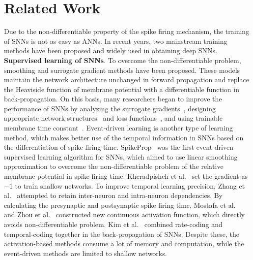 \documentclass[letterpaper]{article} %
\begin{document}
\section{Related Work}
Due to the non-differentiable property of the spike firing mechanism, the training of SNNs is not as easy as ANNs. %
In recent years, two mainstream training methods have been proposed and widely used in obtaining deep SNNs.\\
\textbf{Supervised learning of SNNs}. To overcome the non-differentiable problem, smoothing and surrogate gradient methods \cite{huh2017gradient,jin2018hybrid,wu2018STBP,shrestha2018slayer,zenke2018superspike,bellec2018long,neftci2019surrogate} have been proposed. These models maintain the network architecture unchanged in forward propagation and replace the Heaviside function of membrane potential with a differentiable function in back-propagation. %
On this basis, many researchers began to improve the performance of SNNs by analyzing the surrogate gradients~\cite{Zenke2020.06.29.176925,li2021differentiable}, designing appropriate network structures~\cite{zheng2021going,fang2020incorporating} and loss functions~\cite{deng2022temporal,guo2022recdis}, and using trainable membrane time constant~\cite{fang2020incorporating}.
Event-driven learning is another type of learning method, which makes better use of the temporal information in SNNs based on the differentiation of spike firing time. SpikeProp~\cite{bohte2002error} was the first event-driven supervised learning algorithm for SNNs, which aimed to use linear smoothing approximation to overcome the non-differentiable problem of the relative membrane potential in spike firing time.  Kheradpisheh et al.~ set the gradient as $-1$ to train shallow networks. To improve temporal learning precision, Zhang et al.~ attempted to retain inter-neuron and intra-neuron dependencies. By calculating the 
presynaptic and postsynaptic spike firing time, Mostafa et al.~ and Zhou et al.~  constructed new continuous activation function, which directly avoids non-differentiable problem. Kim et al.~ combined rate-coding and temporal-coding together in the back-propagation of SNNs. Despite these, the activation-based methods consume a lot of memory and computation, while the event-driven methods are limited to shallow networks.\\
\end{document}
